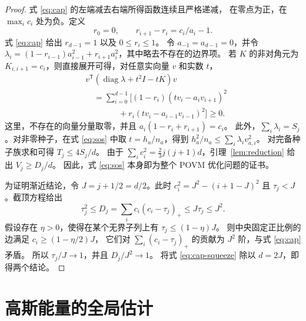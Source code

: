 \documentclass[aps,pra,reprint,superscriptaddress,longbibliography]{revtex4-2}
\theoremstyle{remark}
\DeclareMathOperator{\diag}{diag}
\begin{document}
\begin{proof}

式 \eqref{eq:cap} 的左端减去右端所得函数连续且严格递减，
在零点为正，在 $\max_i c_i$ 处为负。定义
\[
 r_0=0,\qquad r_{i+1}-r_i=c_i/a_i-1.
\]
式 \eqref{eq:cap} 给出 $r_{d-1}=1$ 以及 $0\leq r_i\leq1$。
令 $a_{-1}=a_{d-1}=0$，并令
$\lambda_i=(1-r_{i-1})a_{i-1}^2+r_{i+1}a_i^2$，其中略去不存在的边界项。
若 $K$ 的非对角元为 $K_{i,i+1}=c_i$，则直接展开可得，对任意实向量 $v$ 和实数 $t$，
\begin{equation}
\begin{aligned}
&v^{\mathsf T}(\diag\lambda+t^2I-tK)v\\
&\quad=\sum_{i=0}^{d-1}\bigl[(1-r_i)(tv_i-a_iv_{i+1})^2\\
&\qquad\qquad{}+r_i(tv_i-a_{i-1}v_{i-1})^2\bigr]\geq0.
\end{aligned}
\label{eq:sos}
\end{equation}
这里，不存在的向量分量取零，并且 $a_i(1-r_i+r_{i+1})=c_i$。
此外，$\sum_i\lambda_i=S_j$。对非零种子，在式 \eqref{eq:sos} 中取 $t=h_a/n_a$，得到
$h_a^2/n_a\leq\sum_i\lambda_i v_{a,i}^2$。
对完备种子族求和可得 $T_j\leq4S_j/d$。
由于 $\sum_i c_i^2=\frac23j(j+1)d$，引理~\ref{lem:reduction} 给出 $V_j\geq D_j/d$。
因此，式 \eqref{eq:sos} 本身即为整个 POVM 优化问题的证书。

为证明渐近结论，令 $J=j+1/2=d/2$。此时
$c_i^2=J^2-(i+1-J)^2$ 且 $\tau_j<J$。截顶方程给出
\begin{equation}
 \tau_j^2\leq D_j=\sum_i c_i(c_i-\tau_j)_+
 \leq J\tau_j\leq J^2.
 \label{eq:cap-squeeze}
\end{equation}
假设存在 $\eta>0$，使得在某个无界子列上有 $\tau_j\leq(1-\eta)J$。
则中央固定正比例的边满足 $c_i\geq(1-\eta/2)J$，
它们对 $\sum_i(c_i-\tau_j)_+$ 的贡献为 $J^2$ 阶，与式 \eqref{eq:cap} 矛盾。
所以 $\tau_j/J\to1$，并且 $D_j/J^2\to1$。
将式 \eqref{eq:cap-squeeze} 除以 $d=2J$，即得两个结论。

\end{proof}

\section{高斯能量的全局估计}\label{sec:energy-proof}
\end{document}
